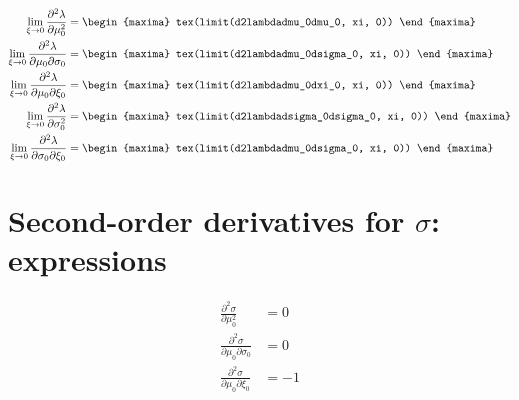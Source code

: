 {\color{MonVertF}
\begin{align*}
\lim_{\xi \to 0} \frac{\partial^2 \lambda}{\partial \mu_0^2} &=
\begin{maxima}
tex(limit(d2lambdadmu_0dmu_0, xi, 0))
\end{maxima} \\
  \lim_{\xi \to 0} \frac{\partial^2 \lambda}{\partial \mu_0 \partial \sigma_0} &=
\begin{maxima}
tex(limit(d2lambdadmu_0dsigma_0, xi, 0))
\end{maxima} \\
   \lim_{\xi \to 0} \frac{\partial^2 \lambda}{\partial \mu_0 \partial \xi_0} &=
\begin{maxima}
tex(limit(d2lambdadmu_0dxi_0, xi, 0))
\end{maxima} \\
   \lim_{\xi \to 0} \frac{\partial^2 \lambda}{\partial \sigma_0^2} &=
\begin{maxima}
tex(limit(d2lambdadsigma_0dsigma_0, xi, 0))
\end{maxima} \\
   \lim_{\xi \to 0} \frac{\partial^2 \lambda}{\partial \sigma_0 \partial \xi_0} &=
\begin{maxima}
tex(limit(d2lambdadmu_0dsigma_0, xi, 0))
\end{maxima}
\end{align*}}

\section{Second-order derivatives for $\sigma$:
  expressions}

{\color{red}
\begin{align*}
  \frac{\partial^2{\sigma}}{\partial \mu_0^2}
  &= 0\\
 \frac{\partial^2{\sigma}}{\partial \mu_0 \partial \sigma_0}
  &= 0\\
\frac{\partial^2{\sigma}}{\partial \mu_0 \partial \xi_0}
  &= -1
\end{align*}
}